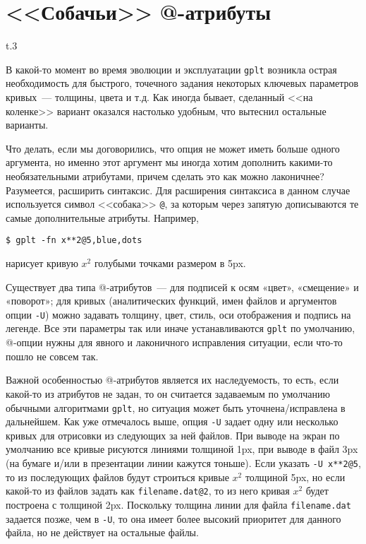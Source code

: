 \documentclass[12pt]{article}
\def\gplt{{\tt gplt}}
\begin{document}
\section{<<Собачьи>> @-атрибуты}\label{dog:attr:sec}
\begin{wrapfigure}[5]{t}{.3\textwidth}
  \vphantom{.}
  \vspace{-2.5cm}

\end{wrapfigure}
В какой-то момент во время эволюции и эксплуатации \verb'gplt' возникла острая необходимость для быстрого, точечного задания некоторых ключевых
параметров кривых~--- толщины, цвета и т.д. Как иногда бывает, сделанный <<на коленке>> вариант
оказался настолько удобным, что вытеснил остальные варианты. 

Что делать, если мы договорились, что опция не может иметь больше одного аргумента, но именно этот аргумент мы иногда хотим дополнить какими-то необязательными атрибутами,
причем сделать это как можно лаконичнее?
Разумеется, расширить синтаксис. Для расширения синтаксиса в данном случае используется символ <<собака>> \verb'@', за которым через запятую дописываются те самые
дополнительные атрибуты. Например,
\begin{verbatim}
$ gplt -fn x**2@5,blue,dots
\end{verbatim}
нарисует кривую $x^2$ голубыми точками размером в 5px.

Существует два типа @-атрибутов~--- для подписей к осям «цвет», «смещение» и «поворот»; для кривых (аналитических функций,
имен файлов и аргументов опции \verb'-U') можно задавать толщину, цвет, стиль, оси отображения и подпись на легенде.
Все эти параметры так или иначе устанавливаются \gplt{} по умолчанию, @-опции нужны для явного и лаконичного исправления ситуации, если что-то пошло не совсем так. 

Важной особенностью @-атрибутов является их наследуемость, то есть, если какой-то из атрибутов не задан, то он считается задаваемым по умолчанию
обычными алгоритмами \gplt, но ситуация может быть уточнена/исправлена в дальнейшем.
Как уже отмечалось выше, опция \verb'-U' задает одну или несколько кривых для отрисовки из следующих за ней файлов. При выводе на экран по умолчанию
все кривые рисуются линиями толщиной 1px, при выводе в файл 3px (на бумаге и/или в презентации линии кажутся тоньше).
Если указать \verb'-U x**2@5', то из последующих файлов будут строиться кривые $x^2$ толщиной 5px, но если какой-то из файлов задать как
\verb'filename.dat@2', то из него кривая $x^2$ будет построена с толщиной 2px. Поскольку толщина линии для файла \verb'filename.dat' задается позже, чем в \verb'-U',
то она имеет более высокий приоритет для данного файла, но не действует на остальные файлы. 
\end{document}
